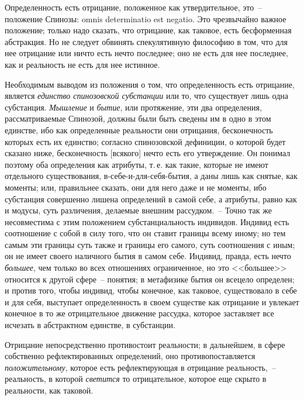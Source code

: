 Определенность есть отрицание, положенное как утвердительное,
это~-- положение Спинозы: omnis determinatio
est negatio\endnotemark{}. Это чрезвычайно важное положение;
только надо сказать, что отрицание, как таковое, есть
бесформенная абстракция. Но не следует обвинять спекулятивную
философию в том, что для нее отрицание
или ничто есть нечто последнее; оно не есть для нее
последнее, как и реальность не есть для нее истинное.


Необходимым выводом из положения о том, что определенность
есть отрицание, является \emph{единство спинозовской
субстанции} или то, что существует лишь одна субстанция.
\emph{Мышление} и \emph{бытие}, или протяжение, эти два определения,
рассматриваемые Спинозой, должны были быть
сведены им в одно в этом единстве, ибо как определенные
реальности они отрицания, бесконечность которых
есть их единство; согласно спинозовской дефиниции, о
которой будет сказано ниже, бесконечность [всякого] нечто
есть его утверждение. Он понимал поэтому оба определения
как атрибуты, т.\,е. как такие, которые не имеют
отдельного существования, в-себе-и-для-себя-бытия, а даны
лишь как снятые, как моменты; или, правильнее
сказать, они для него даже и не моменты, ибо субстанция
совершенно лишена определений в самой себе, а
атрибуты, равно как и модусы, суть различения, делаемые
внешним рассудком.~-- Точно так же несовместима с этим
положением субстанциальность индивидов. Индивид есть
соотношение с собой в силу того, что он ставит границы
всему иному; но тем самым эти границы суть также
и границы его самого, суть соотношения с иным; он
не имеет своего наличного бытия в самом себе. Индивид,
правда, есть нечто \emph{большее}, чем только во всех отношениях
ограниченное, но это <<большее>> относится к другой
сфере~-- понятия; в метафизике бытия он всецело определен;
и против того, чтобы индивид, чтобы конечное, как
таковое, существовало в себе и для себя, выступает определенность
в своем существе как отрицание и увлекает
конечное в то же отрицательное движение рассудка, которое
заставляет все исчезать в абстрактном единстве,
в субстанции.

Отрицание непосредственно противостоит реальности;
в дальнейшем, в сфере собственно рефлектированных
определений, оно противопоставляется \emph{положительному},
которое есть рефлектирующая в отрицание реальность,~--
реальность, в которой \emph{светится} то отрицательное, которое
еще скрыто в реальности, как таковой.

